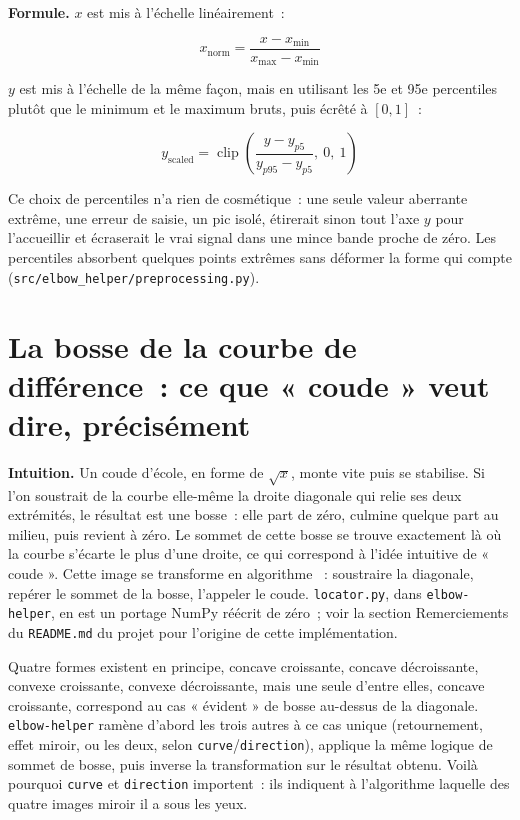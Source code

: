 \documentclass[11pt]{article}
\newcommand{\code}[1]{\texttt{#1}}
\begin{document}
\textbf{Formule.} $x$ est mis à l'échelle linéairement~:

\begin{equation}
x_{\text{norm}} = \frac{x - x_{\min}}{x_{\max} - x_{\min}}
\end{equation}

$y$ est mis à l'échelle de la même façon, mais en utilisant les 5e et 95e
percentiles plutôt que le minimum et le maximum bruts, puis écrêté à
$[0,1]$~:

\begin{equation}
y_{\text{scaled}} = \operatorname{clip}\!\left(\frac{y - y_{p5}}{y_{p95} - y_{p5}},\ 0,\ 1\right)
\end{equation}

Ce choix de percentiles n'a rien de cosmétique~: une seule valeur aberrante
extrême, une erreur de saisie, un pic isolé, étirerait sinon tout l'axe $y$
pour l'accueillir et écraserait le vrai signal dans une mince bande proche
de zéro. Les percentiles absorbent quelques points extrêmes sans déformer
la forme qui compte (\code{src/elbow\_helper/preprocessing.py}).

\section{La bosse de la courbe de différence~: ce que « coude » veut dire, précisément}
\label{sec:diff-curve}

\textbf{Intuition.} Un coude d'école, en forme de $\sqrt{x}$, monte vite
puis se stabilise. Si l'on soustrait de la courbe elle-même la droite
diagonale qui relie ses deux extrémités, le résultat est une bosse~: elle
part de zéro, culmine quelque part au milieu, puis revient à zéro. Le
sommet de cette bosse se trouve exactement là où la courbe s'écarte le plus
d'une droite, ce qui correspond à l'idée intuitive de « coude ». Cette image
se transforme en algorithme \citep{satopaa2011}~: soustraire la diagonale,
repérer le sommet de la bosse, l'appeler le coude. \code{locator.py}, dans
\code{elbow-helper}, en est un portage NumPy réécrit de zéro~; voir la
section Remerciements du \code{README.md} du projet pour l'origine de cette
implémentation.

Quatre formes existent en principe, concave croissante, concave
décroissante, convexe croissante, convexe décroissante, mais une seule
d'entre elles, concave croissante, correspond au cas « évident » de bosse
au-dessus de la diagonale. \code{elbow-helper} ramène d'abord les trois
autres à ce cas unique (retournement, effet miroir, ou les deux, selon
\code{curve}/\code{direction}), applique la même logique de sommet de
bosse, puis inverse la transformation sur le résultat obtenu. Voilà
pourquoi \code{curve} et \code{direction} importent~: ils indiquent à
l'algorithme laquelle des quatre images miroir il a sous les yeux.
\end{document}
